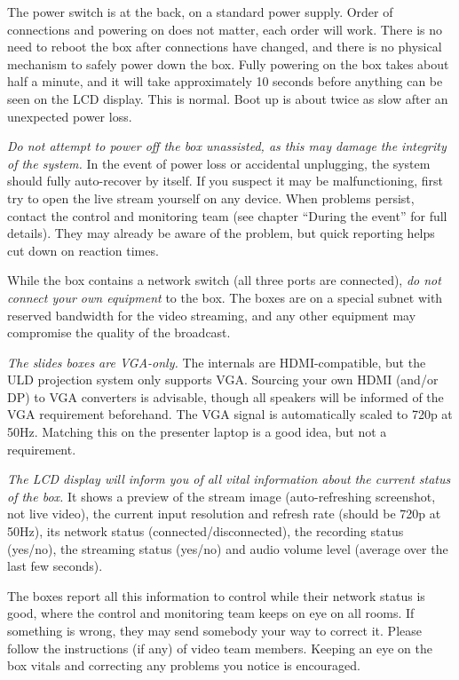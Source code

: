 \documentclass{article}
\begin{document}
The power switch is at the back, on a standard power supply.
Order of connections and powering on does not matter, each order will work. There is no need to reboot the box after connections have changed, and there is no physical mechanism to safely power down the box.
Fully powering on the box takes about half a minute, and it will take approximately 10 seconds before anything can be seen on the LCD display. This is normal. Boot up is about twice as slow after an unexpected power loss.

\emph{Do not attempt to power off the box unassisted, as this may damage the integrity of the system.}
In the event of power loss or accidental unplugging, the system should fully auto-recover by itself. If you suspect it may be malfunctioning, first try to open the live stream yourself on any device. When problems persist, contact the control and monitoring team (see chapter ``During the event'' for full details). They may already be aware of the problem, but quick reporting helps cut down on reaction times.

While the box contains a network switch (all three ports are connected), \emph{do not connect your own equipment} to the box. The boxes are on a special subnet with reserved bandwidth for the video streaming, and any other equipment may compromise the quality of the broadcast.

\emph{The slides boxes are VGA-only.}
The internals are HDMI-compatible, but the ULD projection system only supports VGA.
Sourcing your own HDMI (and/or DP) to VGA converters is advisable, though all speakers will be informed of the VGA requirement beforehand.
The VGA signal is automatically scaled to 720p at 50Hz. Matching this on the presenter laptop is a good idea, but not a requirement.

\emph{The LCD display will inform you of all vital information about the current status of the box.} It shows a preview of the stream image (auto-refreshing screenshot, not live video), the current input resolution and refresh rate (should be 720p at 50Hz), its network status (connected/disconnected), the recording status (yes/no), the streaming status (yes/no) and audio volume level (average over the last few seconds).

The boxes report all this information to control while their network status is good, where the control and monitoring team keeps on eye on all rooms. If something is wrong, they may send somebody your way to correct it. Please follow the instructions (if any) of video team members. Keeping an eye on the box vitals and correcting any problems you notice is encouraged.
\end{document}
